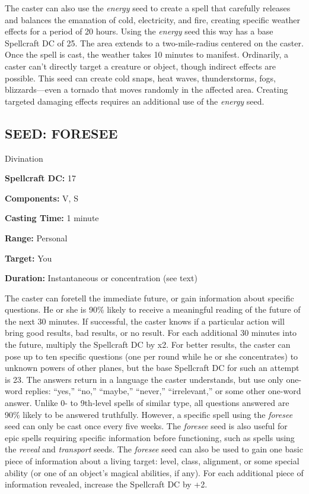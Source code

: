 \documentclass{article}
\begin{document}
The caster can also use the \textit{energy }seed to create a spell that carefully 
releases and balances the emanation of cold, electricity, and fire, creating specific 
weather effects for a period of 20 hours. Using the \textit{energy }seed this way 
has a base Spellcraft DC of 25. The area extends to a two-mile-radius centered 
on the caster. Once the spell is cast, the weather takes 10 minutes to manifest. 
Ordinarily, a caster can't directly target a creature or object, though indirect 
effects are possible. This seed can create cold snaps, heat waves, thunderstorms, 
fogs, blizzards---even a tornado that moves randomly in the affected area. Creating 
targeted damaging effects requires an additional use of the \textit{energy }seed. 

\vspace{12pt}
\subsection*{SEED: FORESEE }

Divination 

\textbf{Spellcraft DC:} 17 

\textbf{Components:} V, S 

\textbf{Casting Time:} 1 minute 

\textbf{Range:} Personal 

\textbf{Target:} You 

\textbf{Duration:} Instantaneous or concentration (see text) 

The caster can foretell the immediate future, or gain information about specific 
questions. He or she is 90\% likely to receive a meaningful reading of the future 
of the next 30 minutes. If successful, the caster knows if a particular action 
will bring good results, bad results, or no result. For each additional 30 minutes 
into the future, multiply the Spellcraft DC by x2. For better results, the caster 
can pose up to ten specific questions (one per round while he or she concentrates) 
to unknown powers of other planes, but the base Spellcraft DC for such an attempt 
is 23.  The answers return in a language the caster understands, but use only one-word 
replies: ``yes,'' ``no,'' ``maybe,'' ``never,'' ``irrelevant,'' or some other one-word 
answer. Unlike 0- to 9th-level spells of similar type, all questions answered are 
90\% likely to be answered truthfully. However, a specific spell using the \textit{foresee 
}seed can only be cast once every five weeks. The \textit{foresee }seed is also 
useful for epic spells requiring specific information before functioning, such 
as spells using the \textit{reveal }and \textit{transport }seeds. The \textit{foresee 
}seed can also be used to gain one basic piece of information about a living target: 
level, class, alignment, or some special ability (or one of an object's magical 
abilities, if any). For each additional piece of information revealed, increase 
the Spellcraft DC by +2. 
\end{document}
